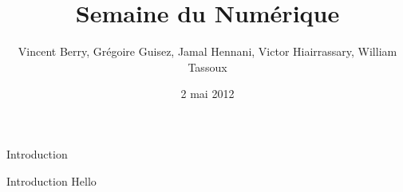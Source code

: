 \documentclass{beamer}
\title{Semaine du Numérique}
\author{Vincent Berry, Grégoire Guisez, Jamal Hennani, Victor Hiairrassary, William Tassoux}
\institute{Polytech' Montpellier, Lirmm}
\date{2 mai 2012}
\begin{document}
\small 


\begin{frame}
    \titlepage
\end{frame}


\begin{frame}{Introduction}
    \begin{block}{Introduction}
    Hello
    \end{block}
\end{frame}
\end{document}
